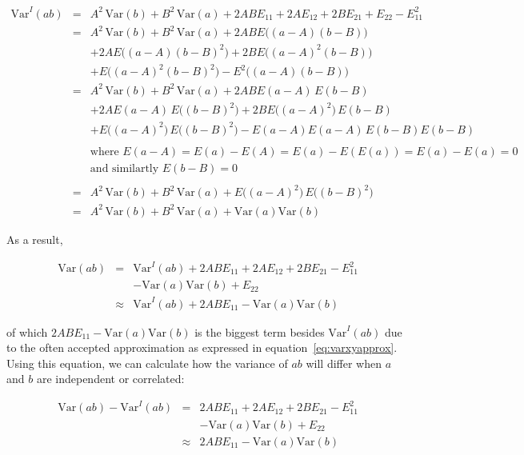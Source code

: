 \begin{eqnarray}
\mbox{Var}^I(ab) &=& A^2\,\mbox{Var}(b) + B^2\,\mbox{Var}(a) + 2ABE_{11} + 2AE_{12} + 2BE_{21} + E_{22} - E_{11}^2 \nonumber \\
&=& A^2\,\mbox{Var}(b) + B^2\,\mbox{Var}(a) + 2ABE \big ((a-A) (b-B) \big) \nonumber \\
&& + 2AE \big ((a-A) (b-B)^2 \big ) + 2BE \big ((a-A)^2 (b-B) \big ) \nonumber \\
&& + E \big ((a-A)^2 (b-B)^2 \big ) - E^2 \big ((a-A) (b-B) \big )\nonumber \\
&=& A^2\,\mbox{Var}(b) + B^2\,\mbox{Var}(a) + 2ABE (a-A) \,E (b-B) \nonumber \\
&& + 2AE (a-A) \,E \big ( (b-B)^2 \big ) + 2BE \big ((a-A)^2 \big ) \,E(b-B) \nonumber \\
&& + E \big ((a-A)^2 \big ) \, E \big ((b-B)^2 \big ) - E(a-A)E(a-A)\,E(b-B)E(b-B) \nonumber \\
\nonumber \\
&& \mbox{where $E(a-A) = E(a)-E(A) = E(a) - E(E(a)) = E(a) - E(a) = 0$} \nonumber\\
&& \mbox{and similartly $E(b-B) = 0$} \nonumber\\
\nonumber \\
&=& A^2\,\mbox{Var}(b) + B^2\,\mbox{Var}(a) + E \big ((a-A)^2 \big) \, E \big ( (b-B)^2 \big) \nonumber \\
&=& A^2\,\mbox{Var}(b) + B^2\,\mbox{Var}(a) + \mbox{Var}(a)\mbox{Var}(b) \label{eq:varxyindep}
\end{eqnarray}

As a result,

\begin{eqnarray}
\mbox{Var}(ab) &=& \mbox{Var}^I(ab) + 2ABE_{11} + 2AE_{12} + 2BE_{21} - E_{11}^2 \nonumber \\
&& -\mbox{Var}(a) \mbox{Var}(b) + E_{22} \label{eq:indepvsdep}\\
&\approx& \mbox{Var}^I(ab) + 2ABE_{11} -\mbox{Var}(a) \mbox{Var}(b)
\end{eqnarray}

of which $2ABE_{11} -\mbox{Var}(a) \mbox{Var}(b)$ is the biggest term besides $\mbox{Var}^I(ab)$ due to the often accepted approximation as expressed in equation~\ref{eq:varxyapprox}. Using this equation, we can calculate how the variance of $ab$ will differ when $a$ and $b$ are independent or correlated:

\begin{eqnarray}
\mbox{Var}(ab) - \mbox{Var}^I(ab) &=&  2ABE_{11} + 2AE_{12} + 2BE_{21} - E_{11}^2 \nonumber \\
&& -\mbox{Var}(a) \mbox{Var}(b) + E_{22}\label{eq:diffdepindep} \\
&\approx&  2ABE_{11} -\mbox{Var}(a) \mbox{Var}(b) \label{eq:diffdepindepapprox} 
\end{eqnarray}

